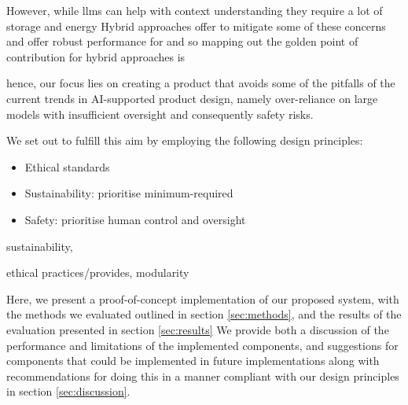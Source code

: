 However, while llms can help with context understanding they require a lot of storage and energy 
Hybrid approaches offer to mitigate some of these concerns and offer robust performance for 
and so mapping out the golden point of contribution for hybrid approaches is 

hence, our focus lies on creating a product that avoids some of the pitfalls of the current trends in AI-supported product design, namely over-reliance on large models with insufficient oversight and consequently safety risks.

We set out to fulfill this aim by employing the following design principles: 

\begin{itemize}
    \item Ethical standards
    \item Sustainability: prioritise minimum-required 
    \item Safety: prioritise human control and oversight 
\end{itemize}

sustainability,

ethical practices/provides, modularity



Here, we present a proof-of-concept implementation of our proposed system, with the methods we evaluated outlined in section \autoref{sec:methods}, and the results of the evaluation presented in section \autoref{sec:results}
We provide both a discussion of the performance and limitations of the implemented components, and suggestions for components that could be implemented in future implementations along with recommendations for doing this in a manner compliant with our design principles in section \autoref{sec:discussion}.